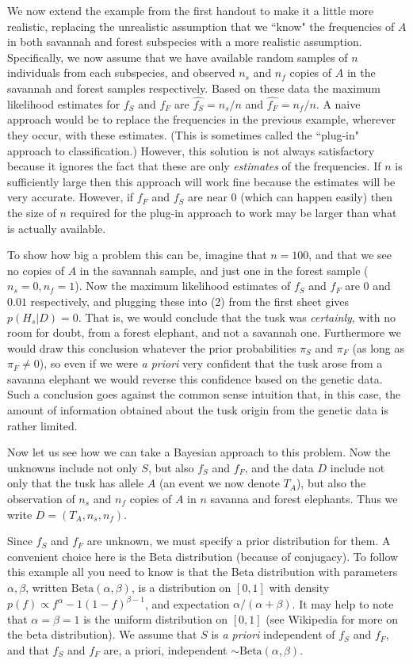 \documentclass{article}[11pt]
\def\ffA{f_F}
\def\fsA{f_S}
\def\nsA{{n_s}}
\def\nfA{{n_f}}
\def\pif{\pi_F}
\def\pis{\pi_S}
\def\ta{T_A}
\def\be{\text{Beta}}
\begin{document}
We now extend the example from the first handout to make it a little more realistic, replacing the unrealistic assumption that we ``know" the frequencies of $A$ in both savannah and forest subspecies with a more realistic assumption. Specifically, we now assume that we have available random samples of $n$ individuals from each subspecies, and observed $\nsA$ and $\nfA$ copies of $A$ in the savannah and forest samples respectively. Based on these data the maximum likelihood estimates
for $\fsA$ and $\ffA$ are $\hat{\fsA} = \nsA/n$ and $\hat{\ffA} = \nfA/n$.
A naive approach would be to replace the frequencies in the previous example, wherever they occur, with these estimates. (This is sometimes called
the ``plug-in" approach to classification.) However, this solution is not always satisfactory because it ignores the fact that these are only {\it estimates} of the frequencies. If $n$ is sufficiently large then this approach will work fine because the estimates will be very accurate. However, if $\ffA$ and $\fsA$ are near 0 (which can happen easily) then the size of $n$ required for the plug-in approach to work may be larger than what is actually available. 

To show how big a problem this can be, imagine that $n=100$, and that we see no copies of $A$ in the savannah sample, and just one in the forest sample ($\nsA = 0, \nfA=1$). Now the maximum likelihood estimates of $\fsA$ and $\ffA$ are $0$ and $0.01$ respectively, and plugging these into (2) from the first sheet gives $p(H_s|D) = 0$. That is, we would conclude that the tusk was {\it certainly}, with no room for doubt, from a forest elephant, and not a savannah one. Furthermore we would draw this conclusion whatever the prior probabilities $\pis$ and $\pif$ (as long as $\pif \neq 0$), so even if we were {\it a priori} very confident that the tusk arose from a savanna elephant we would reverse this confidence based on the genetic data. Such a conclusion goes against the common sense intuition that, in this case, the amount of information obtained about the tusk origin from the genetic data is rather limited.

Now let us see how we can take a Bayesian approach to this problem. Now the unknowns include not only $S$, but also $\fsA$ and $\ffA$, and the data $D$ 
include not only that the tusk has allele $A$ (an event we now denote $\ta$), but also the observation of $\nsA$ and $\nfA$ copies of $A$ in $n$ savanna and forest elephants. Thus we write $D=(\ta,\nsA,\nfA)$.

Since $\fsA$ and $\ffA$ are unknown, we must specify a prior distribution for
them. A convenient choice here is the Beta distribution (because of conjugacy). To follow this example all you need to know is that the Beta distribution with parameters $\alpha, \beta$, written $\be(\alpha,\beta)$, is a distribution on $[0,1]$ with density 
$p(f) \propto f^\alpha-1 (1-f)^{\beta-1}$, and expectation $\alpha/(\alpha+\beta)$. It may help to note that $\alpha=\beta=1$ is the uniform distribution on $[0,1]$ (see Wikipedia for more on the beta distribution). We assume that $S$ is {\it a priori} independent of $\fsA$ and $\ffA$, and that $\fsA$ and $\ffA$ are, a priori, independent $\sim \be(\alpha,\beta)$.
\end{document}
